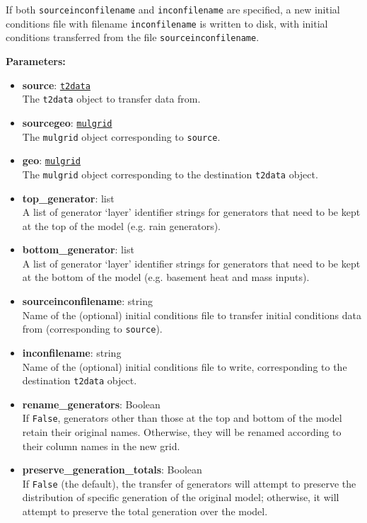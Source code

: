 If both \texttt{sourceinconfilename} and \texttt{inconfilename} are specified, a new initial conditions file with filename \texttt{inconfilename} is written to disk, with initial conditions transferred from the file \texttt{sourceinconfilename}.

\textbf{Parameters:}
\begin{itemize}
\item \textbf{source}: \hyperref[datafiles]{\texttt{t2data}}\\
  The \texttt{t2data} object to transfer data from.
\item \textbf{sourcegeo}: \hyperref[mulgrids]{\texttt{mulgrid}}\\
  The \texttt{mulgrid} object corresponding to \texttt{source}.
\item \textbf{geo}: \hyperref[mulgrids]{\texttt{mulgrid}}\\
  The \texttt{mulgrid} object corresponding to the destination \texttt{t2data} object.
\item \textbf{top\_generator}: list\\
  A list of generator `layer' identifier strings for generators that need to be kept at the top of the model (e.g. rain generators).
\item \textbf{bottom\_generator}: list\\
  A list of generator `layer' identifier strings for generators that need to be kept at the bottom of the model (e.g. basement heat and mass inputs).
\item \textbf{sourceinconfilename}: string\\
  Name of the (optional) initial conditions file to transfer initial conditions data from (corresponding to \texttt{source}).
\item \textbf{inconfilename}: string\\
  Name of the (optional) initial conditions file to write, corresponding to the destination \texttt{t2data} object.
\item \textbf{rename\_generators}: Boolean\\
  If \texttt{False}, generators other than those at the top and bottom of the model retain their original names.  Otherwise, they will be renamed according to their column names in the new grid.
\item \textbf{preserve\_generation\_totals}: Boolean\\
  If \texttt{False} (the default), the transfer of generators will attempt to preserve the distribution of specific generation of the original model; otherwise, it will attempt to preserve the total generation over the model.
\end{itemize}

